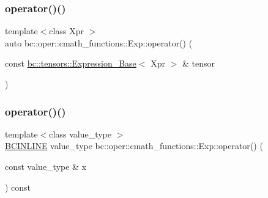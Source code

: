 \mbox{\label{structbc_1_1oper_1_1cmath__functions_1_1Exp_a9570cb79f760e9422dfff9c6c4bd01e1}} 
\subsubsection{\texorpdfstring{operator()()}{operator()()}\hspace{0.1cm}{\footnotesize\ttfamily [2/3]}}
{\footnotesize\ttfamily template$<$class Xpr $>$ \\
auto bc\+::oper\+::cmath\+\_\+functions\+::\+Exp\+::operator() (\begin{DoxyParamCaption}\item[{const \hyperlink{classbc_1_1tensors_1_1Expression__Base}{bc\+::tensors\+::\+Expression\+\_\+\+Base}$<$ Xpr $>$ \&}]{tensor }\end{DoxyParamCaption})\hspace{0.3cm}{\ttfamily [inline]}}

\mbox{\label{structbc_1_1oper_1_1cmath__functions_1_1Exp_a5df0815aae9d0b9185d3a54b2915f848}} 
\subsubsection{\texorpdfstring{operator()()}{operator()()}\hspace{0.1cm}{\footnotesize\ttfamily [3/3]}}
{\footnotesize\ttfamily template$<$class value\+\_\+type $>$ \\
\hyperlink{common_8h_a6699e8b0449da5c0fafb878e59c1d4b1}{B\+C\+I\+N\+L\+I\+NE} value\+\_\+type bc\+::oper\+::cmath\+\_\+functions\+::\+Exp\+::operator() (\begin{DoxyParamCaption}\item[{const value\+\_\+type \&}]{x }\end{DoxyParamCaption}) const\hspace{0.3cm}{\ttfamily [inline]}}



